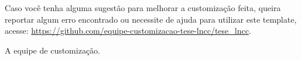 Caso você tenha alguma sugestão para melhorar a customização feita, queira reportar algum
erro encontrado ou necessite de ajuda para utilizar este template, acesse:
\url{https://github.com/equipe-customizacao-tese-lncc/tese_lncc}.

\vspace{20pt}
\begin{flushright}
A equipe de customização.
\end{flushright}